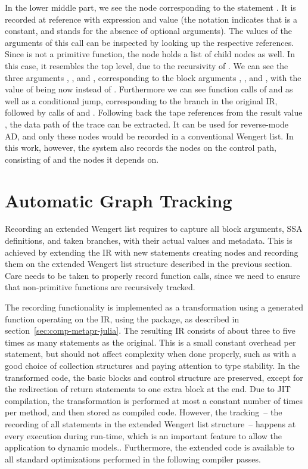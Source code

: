 In the lower middle part, we see the node corresponding to the statement .  It is recorded at reference  with expression  and value
 (the notation  indicates that  is a constant, and 
stands for the absence of optional arguments). The values of the arguments of this call can be
inspected by looking up the respective references.  Since  is not a primitive function,
the node holds a list of child nodes as well.  In this case, it resembles the top level, due to the
recursivity of . We can see the three arguments , , and ,
corresponding to the block arguments , , and , with the value of
 being now  instead of .  Furthermore we can see function calls of
 and \jlinl{<} as well as a conditional jump, corresponding to the branch in the
original IR, followed by calls of \jlinl{+} and .  Following back the tape references
from the result value , the data path of the trace can be extracted.  It can be used for
reverse-mode AD, and only these nodes would be recorded in a conventional Wengert list.  In this
work, however, the system also records the nodes on the control path, consisting of  and
the nodes it depends on.

\section{Automatic Graph Tracking}
\label{sec:autom-graph-track}

Recording an extended Wengert list requires to capture all block arguments, SSA definitions, and
taken branches, with their actual values and metadata. This is achieved by extending the IR with new
statements creating nodes and recording them on the extended Wengert list structure described in the
previous section. Care needs to be taken to properly record function calls, since we need to ensure
that non-primitive functions are recursively tracked.

The recording functionality is implemented as a transformation using a generated function operating
on the IR, using the  package, as described in
section~\ref{sec:comp-metapr-julia}.  The resulting IR consists of about three to five times as many
statements as the original.  This is a small constant overhead per statement, but should not affect
complexity when done properly, such as with a good choice of collection structures and paying
attention to type stability.  In the transformed code, the basic blocks and control structure are
preserved, except for the redirection of return statements to one extra block at the end.  Due to
JIT compilation, the transformation is performed at most a constant number of times per method, and
then stored as compiled code.  However, the tracking~-- the recording of all statements in the
extended Wengert list structure~-- happens at every execution during run-time, which is an important
feature to allow the application to dynamic models..  Furthermore, the extended code is available to
all standard optimizations performed in the following compiler passes.

